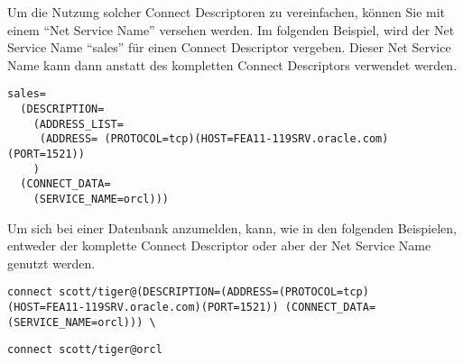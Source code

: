           Um die Nutzung solcher Connect Descriptoren zu vereinfachen, k\"onnen Sie mit einem \enquote{Net Service Name} versehen werden. Im folgenden Beispiel, wird der Net Service Name \enquote{sales} f\"ur einen Connect Descriptor vergeben. Dieser Net Service Name kann dann anstatt des kompletten Connect Descriptors verwendet werden.
          \begin{lstlisting}[caption={Aufbau eines Net Service Names},label=admin609,language=configfile]
sales=
  (DESCRIPTION=
    (ADDRESS_LIST=
     (ADDRESS= (PROTOCOL=tcp)(HOST=FEA11-119SRV.oracle.com)(PORT=1521))
    )
  (CONNECT_DATA=
    (SERVICE_NAME=orcl)))
          \end{lstlisting}
          Um sich bei einer Datenbank anzumelden, kann, wie in den folgenden
          Beispielen, entweder der komplette Connect Descriptor oder aber der
          Net Service Name genutzt werden.
          \begin{lstlisting}[caption={Verwendung eines Connect Descriptors als Connect Identifier},label=admin610,language=sqlplus,alsolanguage=terminal]
connect scott/tiger@(DESCRIPTION=(ADDRESS=(PROTOCOL=tcp)
(HOST=FEA11-119SRV.oracle.com)(PORT=1521)) (CONNECT_DATA=(SERVICE_NAME=orcl))) \
          \end{lstlisting}
          \begin{lstlisting}[caption={Verwendung eines Net Service Name als Connect Identifier},label=admin611,language=sqlplus]
connect scott/tiger@orcl
          \end{lstlisting}
